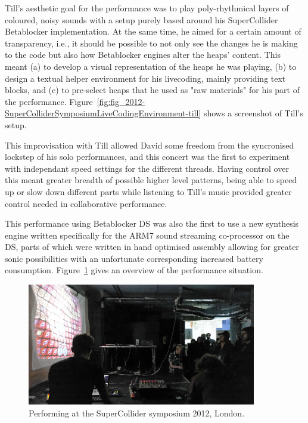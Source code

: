 \documentclass[letterpaper, 12pt]{article}
\begin{document}
Till's aesthetic goal for the performance was to play poly-rhythmical layers of coloured, noisy sounds with a setup purely based around his SuperCollider Betablocker implementation. 
At the same time, he aimed for a certain amount of transparency, i.e., it should be possible to not only see the changes he is making to the code but also how  Betablocker engines alter the heaps' content.
This meant 
(a) to develop a visual representation of the heaps he was playing, 
(b) to design a textual helper environment for his livecoding, mainly providing text blocks, and
(c) to pre-select heaps that he used as "raw materials" for his part of the  performance.
Figure~\ref{fig:fig_2012-SuperColliderSymposiumLiveCodingEnvironment-till} shows a screenshot of Till's setup.


This improvisation with Till allowed David some freedom from the syncronised lockstep of his solo performances, and this concert was the first to experiment with independant speed settings for the different threads. Having control over this meant greater breadth of possible higher level patterns, being able to speed up or slow down different parts while listening to Till's music provided greater control needed in collaborative performance. 

This performance using Betablocker DS was also the first to use a new synthesis engine written specifically for the ARM7 sound streaming co-processor on the DS, parts of which were written in hand optimised assembly allowing for greater sonic possibilities with an unfortunate corresponding increased battery consumption. 
Figure~\ref{fig:fig_7083569047_14131b8ee2_o} gives an overview of the performance situation.

\begin{figure}
	\centering
		\includegraphics[width=10cm]{7083569047_14131b8ee2_o}
	\caption{Performing at the SuperCollider symposium 2012, London.}
	\label{fig:fig_7083569047_14131b8ee2_o}
\end{figure}
\parskip 18pt
\end{document}

